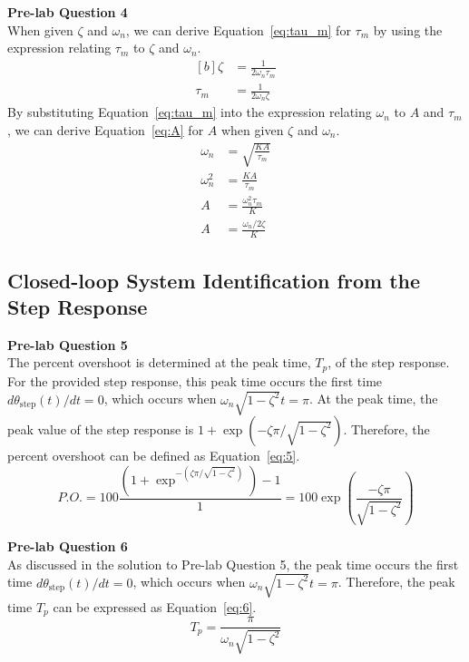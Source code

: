 \documentclass[12pt]{article}
\begin{document}
\textbf{Pre-lab Question 4} \\
When given $\zeta$ and $\omega_n$, we can derive Equation~\ref{eq:tau_m} for $\tau_m$ by using the expression relating $\tau_m$ to $\zeta$ and $\omega_n$.
\begin{equation} \label{eq:tau_m}
\begin{aligned}[b]
    \zeta &= \frac{1}{2\omega_n\tau_m} \\
    \tau_m &= \frac{1}{2\omega_n\zeta}
\end{aligned}
\end{equation}
By substituting Equation~\ref{eq:tau_m} into the expression relating $\omega_n$ to $A$ and $\tau_m$, we can derive Equation~\ref{eq:A} for $A$ when given $\zeta$ and $\omega_n$.
\begin{equation} \label{eq:A}
\begin{aligned}
    \omega_n &= \sqrt{\frac{KA}{\tau_m}} \\
    \omega_n^2 &= \frac{KA}{\tau_m} \\
    A &= \frac{\omega_n^2\tau_m}{K} \\
    A &= \frac{\omega_n / 2\zeta}{K}
\end{aligned}    
\end{equation}


\subsection{Closed-loop System Identification from the Step Response}
\textbf{Pre-lab Question 5} \\
The percent overshoot is determined at the peak time, $T_p$, of the step response. For the provided step response, this peak time occurs the first time $d\theta_{\text{step}}(t)/dt = 0$, which occurs when $\omega_n\sqrt{1-\zeta^2}t = \pi$. At the peak time, the peak value of the step response is $1 + \exp\left( -\zeta\pi / \sqrt{1-\zeta^2} \right)$. Therefore, the percent overshoot can be defined as Equation~\ref{eq:5}. 
\begin{equation} \label{eq:5}
    P.O. = 100\frac{(1 + \exp^{-(\zeta\pi / \sqrt{1-\zeta^2})})-1}{1} = 100\exp\left(\frac{-\zeta\pi}{\sqrt{1-\zeta^2}}\right)
\end{equation}

\textbf{Pre-lab Question 6} \\
As discussed in the solution to Pre-lab Question 5, the peak time occurs the first time $d\theta_{\text{step}}(t)/dt = 0$, which occurs when $\omega_n\sqrt{1-\zeta^2}t = \pi$. Therefore, the peak time $T_p$ can be expressed as Equation~\ref{eq:6}.
\begin{equation} \label{eq:6}
    T_p = \frac{\pi}{\omega_n\sqrt{1-\zeta^2}}
\end{equation}
\end{document}
